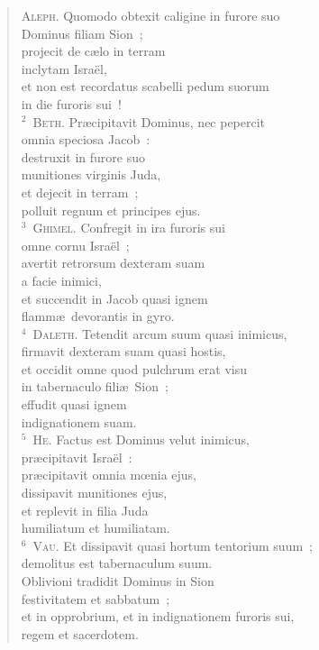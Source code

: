 \begin{flushleft}\begin{verse}\vspace{-19pt}\textsc{Aleph.} Quomodo obtexit caligine in furore suo\\ Dominus filiam Sion~;\\ projecit de c\ae lo in terram\\ inclytam Isra\"el,\\ et non est recordatus scabelli pedum suorum\\ in die furoris sui~!\\
${}^{2}$~\textsc{Beth.} Pr\ae cipitavit Dominus, nec pepercit\\ omnia speciosa Jacob~:\\ destruxit in furore suo\\ munitiones virginis Juda,\\ et dejecit in terram~;\\ polluit regnum et principes ejus.\\
${}^{3}$~\textsc{Ghimel.} Confregit in ira furoris sui\\ omne cornu Isra\"el~;\\ avertit retrorsum dexteram suam\\ a facie inimici,\\ et succendit in Jacob quasi ignem\\ flamm\ae\ devorantis in gyro.\\
${}^{4}$~\textsc{Daleth.} Tetendit arcum suum quasi inimicus,\\ firmavit dexteram suam quasi hostis,\\ et occidit omne quod pulchrum erat visu\\ in tabernaculo fili\ae\ Sion~;\\ effudit quasi ignem\\ indignationem suam.\\
${}^{5}$~\textsc{He.} Factus est Dominus velut inimicus,\\ pr\ae cipitavit Isra\"el~:\\ pr\ae cipitavit omnia mœnia ejus,\\ dissipavit munitiones ejus,\\ et replevit in filia Juda\\ humiliatum et humiliatam.\\
${}^{6}$~\textsc{Vau.} Et dissipavit quasi hortum tentorium suum~;\\ demolitus est tabernaculum suum.\\ Oblivioni tradidit Dominus in Sion\\ festivitatem et sabbatum~;\\ et in opprobrium, et in indignationem furoris sui,\\ regem et sacerdotem.\\

\end{verse}
\end{flushleft}
